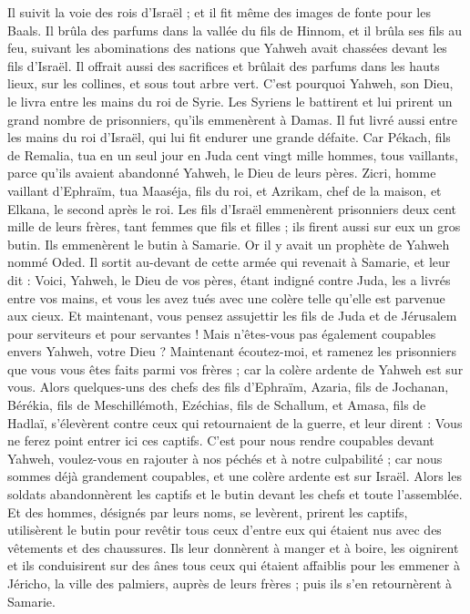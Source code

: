 \begin{multicols}{2}
Il suivit la voie des rois d'Israël ; et il fit même des images de fonte pour les Baals.
Il brûla des parfums dans la vallée du fils de Hinnom, et il brûla ses fils au feu, suivant les abominations des nations que Yahweh avait chassées devant les fils d’Israël.
Il offrait aussi des sacrifices et  brûlait des parfums dans les hauts lieux, sur les collines, et sous tout arbre vert.
C’est pourquoi Yahweh, son Dieu, le livra entre les mains du roi de Syrie. Les Syriens le battirent et lui prirent un grand nombre de prisonniers, qu'ils emmenèrent à Damas. Il fut livré aussi entre les mains du roi d'Israël, qui lui fit endurer une grande défaite.
Car Pékach, fils de Remalia, tua en un seul jour en Juda cent vingt mille hommes, tous vaillants, parce qu'ils avaient abandonné Yahweh, le Dieu de leurs pères.
Zicri, homme vaillant d'Ephraïm, tua Maaséja, fils du roi, et Azrikam, chef de la maison, et Elkana, le second après le roi.
Les fils d’Israël emmenèrent prisonniers deux cent mille de leurs frères, tant femmes que fils et filles ; ils firent aussi sur eux un gros butin. Ils emmenèrent le butin à Samarie.
Or il y avait un prophète de Yahweh nommé Oded. Il sortit au-devant de cette armée qui revenait à Samarie, et leur dit : Voici, Yahweh, le Dieu de vos pères, étant indigné contre Juda, les a livrés entre vos mains, et vous les avez tués avec une colère telle qu’elle est parvenue aux cieux.
Et maintenant, vous pensez assujettir les fils de Juda et de Jérusalem pour serviteurs et pour servantes ! Mais n'êtes-vous pas également coupables envers Yahweh, votre Dieu ?
Maintenant écoutez-moi, et ramenez les prisonniers que vous vous êtes faits parmi vos frères ; car la colère ardente de Yahweh est sur vous.
Alors quelques-uns des chefs des fils d'Ephraïm, Azaria, fils de Jochanan, Bérékia, fils de Meschillémoth, Ezéchias, fils de Schallum, et Amasa, fils de Hadlaï, s'élevèrent contre ceux qui retournaient de la guerre,
et leur dirent : Vous ne ferez point entrer ici ces captifs. C’est pour nous rendre coupables devant Yahweh, voulez-vous en rajouter à nos péchés et à notre culpabilité ; car nous sommes déjà grandement coupables, et une colère ardente est sur Israël.
Alors les soldats abandonnèrent les captifs et le butin devant les chefs et toute l'assemblée.
Et des hommes, désignés par leurs noms, se levèrent, prirent les captifs, utilisèrent le butin pour revêtir tous ceux d'entre eux qui étaient nus avec des vêtements et des chaussures. Ils leur donnèrent à manger et à boire, les oignirent et ils conduisirent sur des ânes tous ceux qui étaient affaiblis pour les emmener à Jéricho, la ville des palmiers, auprès de leurs frères ; puis ils s'en retournèrent à Samarie.

\end{multicols}

